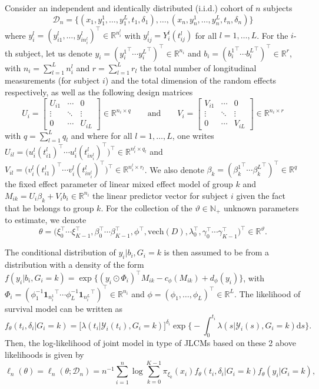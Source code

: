\documentclass[11pt]{article}
\newcommand{\dd}{\mathrm{d}}
\newcommand{\cY}{\mathcal Y}
\newcommand{\cD}{\mathcal D}
\newcommand{\R}{\mathds R}
\newcommand{\N}{\mathds N}
\begin{document}
Consider an independent and identically distributed (i.i.d.) cohort of $n$ subjects
\[ \cD_n = \big\{ (x_1, y_1^1, \ldots, y_1^L, t_1, \delta_1), \ldots, (x_n, y_n^1, \ldots, y_n^L, t_n, \delta_n) \big\} \]
where $y_i^l=(y_{i1}^l, \ldots, y_{in_i^l}^l)^\top \in \R^{n_i^l}$ with $y_{ij}^l=Y_i^l(t_{ij}^l)$ for all $l=1, \ldots, L$. 
For the $i$-th subject, let us denote $y_i = ({y_i^1}^\top \cdots {y_i^L}^\top)^\top \in \R^{n_i}$ and $b_i = ({b_i^1}^\top \cdots {b_i^L}^\top)^\top \in \R^r$, with $n_i = \sum_{l=1}^L n_i^l$ and $r = \sum_{l=1}^L r_l$ the total number of longitudinal measurements (for subject $i$) and the total dimension of the random effects respectively, as well as the following design matrices
\[ U_i = 
\begin{bmatrix}
  U_{i1} & \cdots & 0\\
  \vdots &  \ddots & \vdots \\
  0 & \cdots & U_{iL}
\end{bmatrix} 
\in \R^{n_i \times q}
\qquad \text{and} \qquad
V_i = 
\begin{bmatrix}
  V_{i1} & \cdots & 0\\
  \vdots &  \ddots & \vdots \\
  0 & \cdots & V_{iL}
\end{bmatrix}
\in \R^{n_i \times r}
\]
with $q = \sum_{l=1}^L q_l$ and where for all $l=1, \ldots, L$, one writes $U_{il} = \big(u_i^l(t_{i1}^l)^\top \cdots u_i^l(t_{in_i^l}^l)^\top\big)^\top \in \R^{n_i^l \times q_l}$ and $V_{il} = \big(v_i^l(t_{i1}^l)^\top \cdots v_i^l(t_{in_i^l}^l)^\top\big)^\top \in \R^{n_i^l \times r_l}$.
We also denote $\beta_k = ({\beta_k^1}^\top \cdots {\beta_k^L}^\top)^\top \in \R^q$ the fixed effect parameter of linear mixed effect model of group $k$ and $M_{ik} = U_i\beta_k + V_ib_i \in \R^{n_i}$ the linear predictor vector for subject $i$ given the fact that he belongs to group $k$.
For the collection of the $\vartheta \in \N_+$ unknown parameters to estimate, we denote 
\[ \theta = \big(\xi_0^\top \cdots \xi_{K-1}^\top, \beta_0^\top \cdots \beta_{K-1}^\top, \phi^\top, \text{vech}(D), \lambda_0^\top, \gamma_0^\top \cdots \gamma_{K-1}^\top\big)^\top \in \R^\vartheta .\]

The conditional distribution of $y_i|b_i, G_i=k$ is then assumed to be from a distribution with a density of the form $f(y_i|b_i, G_i=k) = \exp \big\{(y_i \odot \Phi_i)^\top M_{ik} - c_\phi(M_{ik}) + d_\phi(y_i) \big\}$,
with $\Phi_i = (\phi_1^{-1} {\textbf{1}_{n_i^1}}^\top \cdots \phi_L^{-1} {\textbf{1}_{n_i^L}}^\top)^\top \in \R^{n_i}$ and $\phi = (\phi_1, \ldots, \phi_L)^\top \in \R^L$.
The likelihood of survival model can be written as
\[f_\theta(t_i, \delta_i| G_i = k) = \big[\lambda(t_i|\cY_i(t_i), G_i = k)\big]^{\delta_i} \exp \Big\{-\int_0^{t_i} \lambda(s|\cY_i(s), G_i = k) \dd s \Big\}. \]
Then, the log-likelihood of joint model in type of JLCMs based on these 2 above likelihoods is given by
\begin{equation*}
    \ell_n(\theta) = \ell_n(\theta ; \cD_n) = n^{-1} \sum_{i=1}^n \log \sum_{k=0}^{K-1} \pi_{\xi_k}(x_i) f_\theta(t_i, \delta_i| G_i = k) f_\theta(y_i | G_i = k),
\end{equation*}
\
\end{document}

